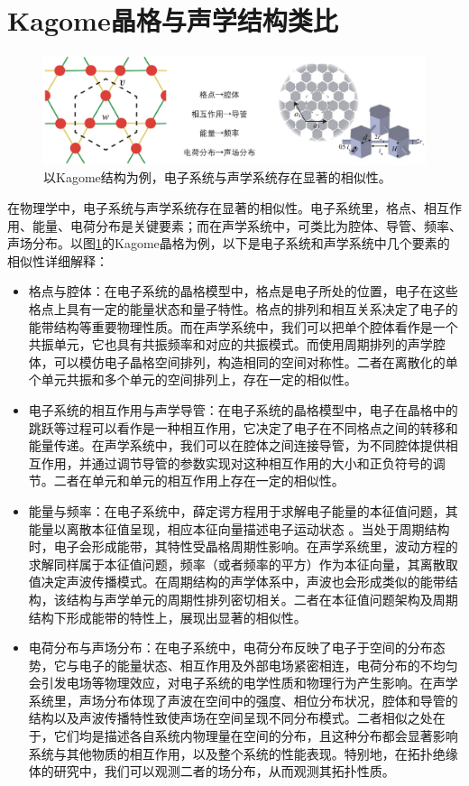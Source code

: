 \section{Kagome晶格与声学结构类比}

\begin{figure}[h!]
  \centering
  \includegraphics[width=1\textwidth]{images/fig3-1.eps} 
  \caption{以Kagome结构为例，电子系统与声学系统存在显著的相似性。}
  \label{fig_3_1}
\end{figure}

在物理学中，电子系统与声学系统存在显著的相似性。电子系统里，格点、相互作用、能量、电荷分布是关键要素；而在声学系统中，可类比为腔体、导管、频率、声场分布。以图\ref{fig_3_1}的Kagome晶格为例，以下是电子系统和声学系统中几个要素的相似性详细解释：
\begin{itemize}
  \item 格点与腔体：在电子系统的晶格模型中，格点是电子所处的位置，电子在这些格点上具有一定的能量状态和量子特性。格点的排列和相互关系决定了电子的能带结构等重要物理性质。而在声学系统中，我们可以把单个腔体看作是一个共振单元，它也具有共振频率和对应的共振模式。而使用周期排列的声学腔体，可以模仿电子晶格空间排列，构造相同的空间对称性。二者在离散化的单个单元共振和多个单元的空间排列上，存在一定的相似性。
  \item 电子系统的相互作用与声学导管：在电子系统的晶格模型中，电子在晶格中的跳跃等过程可以看作是一种相互作用，它决定了电子在不同格点之间的转移和能量传递。在声学系统中，我们可以在腔体之间连接导管，为不同腔体提供相互作用，并通过调节导管的参数实现对这种相互作用的大小和正负符号的调节。二者在单元和单元的相互作用上存在一定的相似性。
  \item 能量与频率：在电子系统中，薛定谔方程用于求解电子能量的本征值问题，其能量以离散本征值呈现，相应本征向量描述电子运动状态 。当处于周期结构时，电子会形成能带，其特性受晶格周期性影响。在声学系统里，波动方程的求解同样属于本征值问题，频率（或者频率的平方）作为本征向量，其离散取值决定声波传播模式。在周期结构的声学体系中，声波也会形成类似的能带结构，该结构与声学单元的周期性排列密切相关。二者在本征值问题架构及周期结构下形成能带的特性上，展现出显著的相似性。 
  \item 电荷分布与声场分布：在电子系统中，电荷分布反映了电子于空间的分布态势，它与电子的能量状态、相互作用及外部电场紧密相连，电荷分布的不均匀会引发电场等物理效应，对电子系统的电学性质和物理行为产生影响。在声学系统里，声场分布体现了声波在空间中的强度、相位分布状况，腔体和导管的结构以及声波传播特性致使声场在空间呈现不同分布模式。二者相似之处在于，它们均是描述各自系统内物理量在空间的分布，且这种分布都会显著影响系统与其他物质的相互作用，以及整个系统的性能表现。特别地，在拓扑绝缘体的研究中，我们可以观测二者的场分布，从而观测其拓扑性质。 
\end{itemize}

